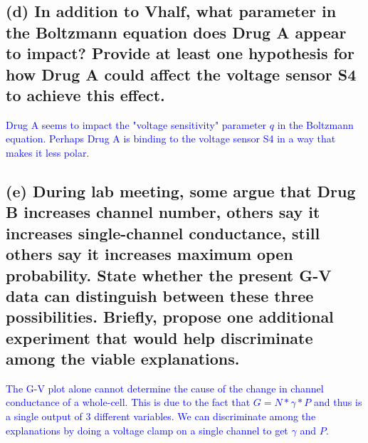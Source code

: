 \documentclass{article}
\begin{document}
\subsection*{(d) In addition to Vhalf, what parameter in the Boltzmann equation does Drug A appear to impact? Provide at least one hypothesis for how Drug A could affect the voltage sensor S4 to achieve this effect.}
\textcolor{blue}{
    Drug A seems to impact the "voltage sensitivity" parameter $q$ in the Boltzmann equation.
    Perhaps Drug A is binding to the voltage sensor S4 in a way that makes it less polar.
}
\subsection*{(e) During lab meeting, some argue that Drug B increases channel number, others say it increases single-channel conductance, still others say it increases maximum open probability. State whether the present G-V data can distinguish between these three possibilities.  Briefly, propose one additional experiment that would help discriminate among the viable explanations.}
\textcolor{blue}{
    The G-V plot alone cannot determine the cause of the change in channel conductance of a whole-cell.
    This is due to the fact that $G = N*\gamma*P$ and thus is a single output of 3 different variables.
    We can discriminate among the explanations by doing a voltage clamp on a single channel
    to get $\gamma$ and $P$.
}
\end{document}
